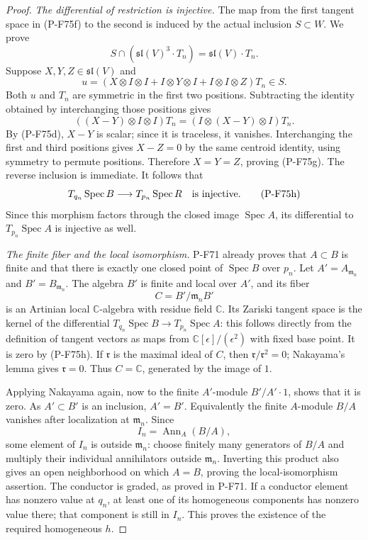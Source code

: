 \begin{proof}
\emph{The differential of restriction is injective.}
The map from the first tangent space in (P-F75f) to
the second is induced by the actual inclusion $S\subset W$.
We prove
\[
 S\cap(\mathfrak{sl}(V)^3\cdot T_n)
                  =\mathfrak{sl}(V)\cdot T_n.
                                                               \tag{P-F75g}
\]
Suppose $X,Y,Z\in\mathfrak{sl}(V)$ and
\[
 u=(X\otimes I\otimes I+I\otimes Y\otimes I
                         +I\otimes I\otimes Z)T_n\in S.
\]
Both $u$ and $T_n$ are symmetric in the first two
positions.  Subtracting the identity obtained by
interchanging those positions gives
\[
 ((X-Y)\otimes I\otimes I)T_n
                    =(I\otimes(X-Y)\otimes I)T_n.
\]
By (P-F75d), $X-Y$ is scalar; since it is traceless,
it vanishes.  Interchanging the first and third
positions gives $X-Z=0$ by the same centroid identity,
using symmetry to permute positions.  Therefore
$X=Y=Z$, proving (P-F75g).  The reverse inclusion is
immediate.  It follows that
\[
 T_{q_n}\operatorname{Spec}B
                \longrightarrow T_{p_n}\operatorname{Spec}R
                     \quad\hbox{is injective}.
                                                               \tag{P-F75h}
\]
Since this morphism factors through the closed image
$\operatorname{Spec}A$, its differential to
$T_{p_n}\operatorname{Spec}A$ is injective as well.

\emph{The finite fiber and the local isomorphism.}
P-F71 already proves that $A\subset B$ is finite and
that there is exactly one closed point of
$\operatorname{Spec}B$ over $p_n$.
Let $A'=A_{\mathfrak m_n}$ and $B'=B_{\mathfrak m_n}$.
The algebra $B'$ is finite and local over $A'$, and
its fiber
\[
                         C=B'/\mathfrak m_nB'
                                                               \tag{P-F75i}
\]
is an Artinian local $\mathbb C$-algebra with residue
field $\mathbb C$.
Its Zariski tangent space is the kernel of the
differential $T_{q_n}\operatorname{Spec}B\to
T_{p_n}\operatorname{Spec}A$: this follows directly
from the definition of tangent vectors as maps from
$\mathbb C[\epsilon]/(\epsilon^2)$ with fixed base point.
It is zero by (P-F75h).  If $\mathfrak r$ is the
maximal ideal of $C$, then
$\mathfrak r/\mathfrak r^2=0$; Nakayama's lemma gives
$\mathfrak r=0$.  Thus $C=\mathbb C$, generated by
the image of $1$.

Applying Nakayama again, now to the finite $A'$-module
$B'/A'\cdot1$, shows that it is zero.
As $A'\subset B'$ is an inclusion, $A'=B'$.
Equivalently the finite $A$-module $B/A$ vanishes
after localization at $\mathfrak m_n$.
Since
\[
                  I_n=\operatorname{Ann}_A(B/A),
                                                               \tag{P-F75j}
\]
some element of $I_n$ is outside $\mathfrak m_n$:
choose finitely many generators of $B/A$ and multiply
their individual annihilators outside $\mathfrak m_n$.
Inverting this product also gives an open neighborhood
on which $A=B$, proving the local-isomorphism assertion.
The conductor is graded, as proved in P-F71.
If a conductor element has nonzero value at $q_n$,
at least one of its homogeneous components has nonzero
value there; that component is still in $I_n$.
This proves the existence of the required homogeneous $h$.


\end{proof}
